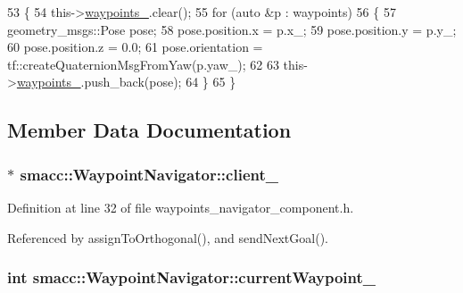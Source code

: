 \begin{DoxyCode}
53 \{
54   this->\hyperlink{classsmacc_1_1WaypointNavigator_a59d691f2177430c407b8e27df07552e9}{waypoints\_}.clear();
55   \textcolor{keywordflow}{for} (\textcolor{keyword}{auto} &p : waypoints)
56   \{
57     geometry\_msgs::Pose pose;
58     pose.position.x = p.x\_;
59     pose.position.y = p.y\_;
60     pose.position.z = 0.0;
61     pose.orientation = tf::createQuaternionMsgFromYaw(p.yaw\_);
62 
63     this->\hyperlink{classsmacc_1_1WaypointNavigator_a59d691f2177430c407b8e27df07552e9}{waypoints\_}.push\_back(pose);
64   \}
65 \}
\end{DoxyCode}


\subsection{Member Data Documentation}
\subsubsection[{\texorpdfstring{client\+\_\+}{client_}}]{$\ast$ smacc\+::\+Waypoint\+Navigator\+::client\+\_\+}\hypertarget{classsmacc_1_1WaypointNavigator_a2bdb0d4aea851d877fcb20e6d0897bb8}{}\label{classsmacc_1_1WaypointNavigator_a2bdb0d4aea851d877fcb20e6d0897bb8}


Definition at line 32 of file waypoints\+\_\+navigator\+\_\+component.\+h.



Referenced by assign\+To\+Orthogonal(), and send\+Next\+Goal().

\subsubsection[{\texorpdfstring{current\+Waypoint\+\_\+}{currentWaypoint_}}]{\setlength{\rightskip}{0pt plus 5cm}int smacc\+::\+Waypoint\+Navigator\+::current\+Waypoint\+\_\+\hspace{0.3cm}{\ttfamily [private]}}\hypertarget{classsmacc_1_1WaypointNavigator_a9a0102946593081338f7bd259f4670bc}{}\label{classsmacc_1_1WaypointNavigator_a9a0102946593081338f7bd259f4670bc}


